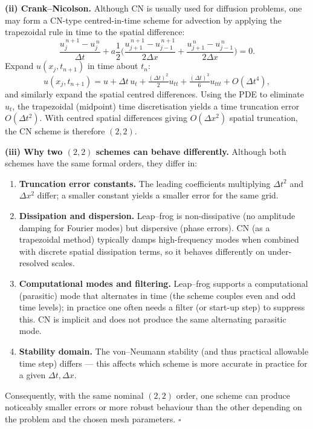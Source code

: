 \documentclass[11pt]{article}
\begin{document}
\medskip

\textbf{(ii) Crank--Nicolson.}
Although CN is usually used for diffusion problems, one may form a CN-type centred-in-time scheme for advection by applying the trapezoidal rule in time to the spatial difference:
\[
\frac{u_j^{\,n+1}-u_j^{\,n}}{\Delta t} + a\frac{1}{2}\Big(\frac{u_{j+1}^{\,n+1}-u_{j-1}^{\,n+1}}{2\Delta x}
+\frac{u_{j+1}^{\,n}-u_{j-1}^{\,n}}{2\Delta x}\Big)=0.
\]
Expand \(u(x_j,t_{n+1})\) in time about \(t_n\):
\[
u(x_j,t_{n+1}) = u + \Delta t\,u_t + \tfrac{(\Delta t)^2}{2}u_{tt} + \tfrac{(\Delta t)^3}{6}u_{ttt} + O(\Delta t^4),
\]
and similarly expand the spatial centred differences. Using the PDE to eliminate \(u_t\), the trapezoidal (midpoint) time discretisation yields a time truncation error \(O(\Delta t^2)\). With centred spatial differences giving \(O(\Delta x^2)\) spatial truncation, the CN scheme is therefore \((2,2)\).

\medskip

\textbf{(iii) Why two \((2,2)\) schemes can behave differently.}
Although both schemes have the same formal orders, they differ in:
\begin{enumerate}
  \item \textbf{Truncation error constants.} The leading coefficients multiplying \(\Delta t^2\) and \(\Delta x^2\) differ; a smaller constant yields a smaller error for the same grid.
  \item \textbf{Dissipation and dispersion.} Leap–frog is non-dissipative (no amplitude damping for Fourier modes) but dispersive (phase errors). CN (as a trapezoidal method) typically damps high-frequency modes when combined with discrete spatial dissipation terms, so it behaves differently on under-resolved scales.
  \item \textbf{Computational modes and filtering.} Leap–frog supports a computational (parasitic) mode that alternates in time (the scheme couples even and odd time levels); in practice one often needs a filter (or start-up step) to suppress this. CN is implicit and does not produce the same alternating parasitic mode.
  \item \textbf{Stability domain.} The von–Neumann stability (and thus practical allowable time step) differs — this affects which scheme is more accurate in practice for a given \(\Delta t,\Delta x\).
\end{enumerate}
Consequently, with the same nominal \((2,2)\) order, one scheme can produce noticeably smaller errors or more robust behaviour than the other depending on the problem and the chosen mesh parameters. \(\square\)
\end{document}
